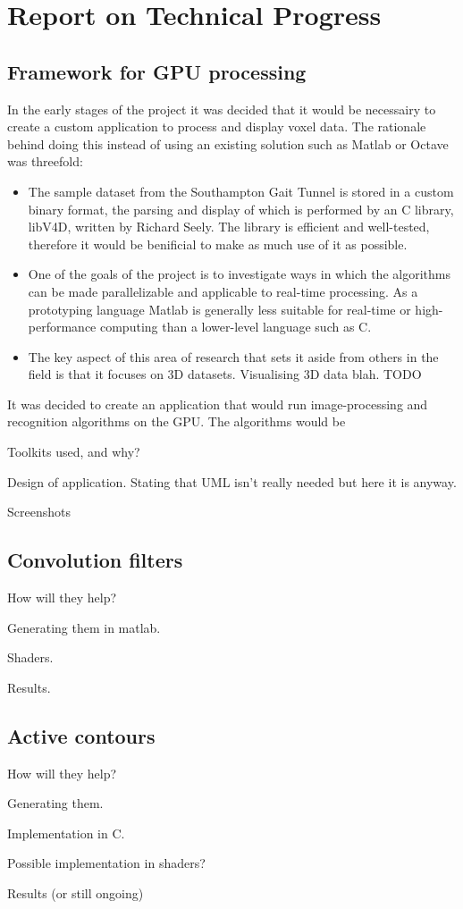 \section{Report on Technical Progress}

\subsection{Framework for GPU processing}

In the early stages of the project it was decided that it would be necessairy to create a custom application to process and display voxel data.
The rationale behind doing this instead of using an existing solution such as Matlab or Octave was threefold:

\begin{itemize}
	\item The sample dataset from the Southampton Gait Tunnel is stored in a custom binary format, the parsing and display of which is
		performed by an C library, libV4D, written by Richard Seely.
		The library is efficient and well-tested, therefore it would be benificial to make as much use of it as possible.
	\item One of the goals of the project is to investigate ways in which the algorithms can be made parallelizable and applicable to real-time processing.
		As a prototyping language Matlab is generally less suitable for real-time or high-performance computing than a lower-level language such as C.
	\item The key aspect of this area of research that sets it aside from others in the field is that it focuses on 3D datasets.
		Visualising 3D data blah.  TODO
\end{itemize}

It was decided to create an application that would run image-processing and recognition algorithms on the GPU.
The algorithms would be 


Toolkits used, and why?

Design of application.  Stating that UML isn't really needed but here it is anyway.

Screenshots


\subsection{Convolution filters}

How will they help?

Generating them in matlab.

Shaders.

Results.

\subsection{Active contours}

How will they help?

Generating them.

Implementation in C.

Possible implementation in shaders?

Results (or still ongoing)

